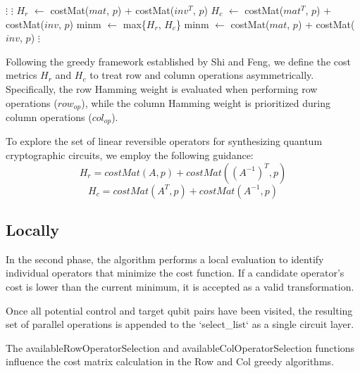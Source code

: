 \begin{algorithm}
\caption{Greedy}
\begin{algorithmic}[1]
\State $\vdots$
	\State $\vdots$
	\State $H_r$ $\leftarrow$ costMat($mat$, $p$) + costMat($inv^{T}$, $p$)
	\State $H_c$ $\leftarrow$ costMat($mat^{T}$, $p$) + costMat($inv$, $p$)
	\State minm $\leftarrow$ max\{$H_r$, $H_c$\}
\Else
	\State minm $\leftarrow$ costMat($mat$, $p$) + costMat($inv$, $p$)
\EndIf
\State $\vdots$
\EndWhile
\end{algorithmic}
\end{algorithm}

Following the greedy framework established by Shi and Feng, we define the cost metrics $H_{r}$ and $H_{c}$ to treat row and column operations asymmetrically. Specifically, the row Hamming weight is evaluated when performing row operations ($row_{op}$), while the column Hamming weight is prioritized during column operations ($col_{op}$). 

To explore the set of linear reversible operators for synthesizing quantum cryptographic circuits, we employ the following guidance:
$$H_{r} = costMat(A, p) + costMat((A^{-1})^{T}, p)$$
$$H_{c} = costMat(A^{T}, p) + costMat(A^{-1}, p)$$

\subsection{Locally}
In the second phase, the algorithm performs a local evaluation to identify individual operators that minimize the cost function. If a candidate operator's cost is lower than the current minimum, it is accepted as a valid transformation. 

Once all potential control and target qubit pairs have been visited, the resulting set of parallel operations is appended to the `select\_list` as a single circuit layer.

The availableRowOperatorSelection and availableColOperatorSelection functions influence the cost matrix calculation in the Row and Col greedy algorithms.


